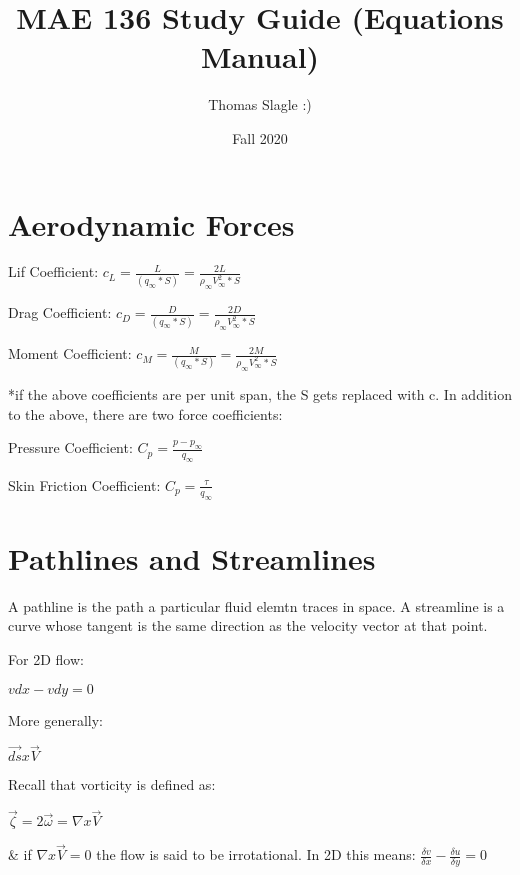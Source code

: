 \documentclass{article}
\title{MAE 136 Study Guide (Equations Manual)}
\author{Thomas Slagle :)}
\date{Fall 2020}
\begin{document}
    \maketitle

    \section{Aerodynamic Forces}
    \begin{flushleft}
        Lif Coefficient: $c_L = \frac{L}{(q_\infty*S)} = \frac{2L}{\rho_\infty V_\infty^2*S}$

        Drag Coefficient: $c_D = \frac{D}{(q_\infty*S)} = \frac{2D}{\rho_\infty V_\infty^2*S}$

        Moment Coefficient: $c_M = \frac{M}{(q_\infty*S)} = \frac{2M}{\rho_\infty V_\infty^2*S}$

        *if the above coefficients are per unit span, the S gets replaced with c. In addition to the above, there are two force coefficients:

        Pressure Coefficient: $C_p = \frac{p-p_\infty}{q_\infty}$

        Skin Friction Coefficient: $C_p = \frac{\tau}{q_\infty}$



    \end{flushleft}

    \section{Pathlines and Streamlines}
    \begin{flushleft}
        A pathline is the path a particular fluid elemtn traces in space.
        A streamline is a curve whose tangent is the same direction as the velocity vector at that point.

        For 2D flow:

        $vdx - vdy = 0$

        More generally:

        $\vec{ds}x\vec{V}$

        Recall that vorticity is defined as:

        $\vec{\zeta}=2\vec{\omega}=\nabla x \vec{V}$

        \& if $\nabla x \vec{V} = 0$ the flow is said to be irrotational. In 2D this means:
        $\frac{\delta v}{\delta x} - \frac{\delta u}{\delta y} = 0$

    \end{flushleft}
\end{document}
